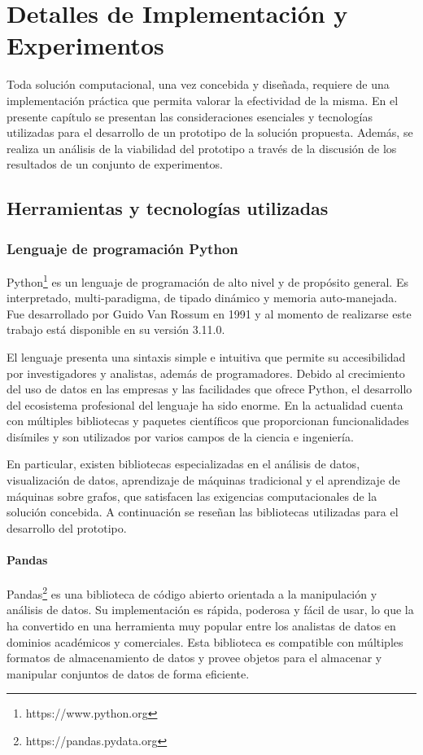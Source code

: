 \chapter{Detalles de Implementación y Experimentos}\label{chapter:implementation}

Toda soluci\'on computacional, una vez concebida y dise\~nada, requiere
de una implementaci\'on pr\'actica que permita valorar la efectividad de la misma.
En el presente cap\'itulo se presentan las consideraciones esenciales y tecnolog\'ias utilizadas
para el desarrollo de un prototipo de la soluci\'on propuesta. Adem\'as, se
realiza un an\'alisis de la viabilidad del prototipo a trav\'es de la discusi\'on de los resultados
de un conjunto de experimentos.
\section{Herramientas y tecnolog\'ias utilizadas}\label{section:tools}



\subsection{Lenguaje de programaci\'on Python}

Python\footnote[1]{https://www.python.org} es un lenguaje de programaci\'on de alto nivel y de prop\'osito
general. Es interpretado, multi-paradigma, de tipado din\'amico y memoria
auto-manejada. Fue desarrollado por Guido Van Rossum en 1991 y al momento
de realizarse este trabajo est\'a disponible en su versi\'on 3.11.0.

El lenguaje presenta una sintaxis simple e intuitiva que permite su
accesibilidad por investigadores y analistas, adem\'as de programadores.
Debido al crecimiento del uso de datos en las empresas
y las facilidades que ofrece Python, el desarrollo del ecosistema profesional
del lenguaje ha sido enorme. En la actualidad cuenta con m\'ultiples bibliotecas y
paquetes cient\'ificos que proporcionan
funcionalidades dis\'imiles y son utilizados por varios campos
de la ciencia e ingenier\'ia.

En particular, existen bibliotecas especializadas en el an\'alisis de
datos, visualizaci\'on de datos, aprendizaje
de m\'aquinas tradicional y el aprendizaje de m\'aquinas sobre grafos, que
satisfacen las exigencias computacionales de la soluci\'on concebida.
A continuaci\'on se rese\~nan las bibliotecas utilizadas para
el desarrollo del prototipo.


\subsubsection{Pandas}
Pandas\footnote[2]{https://pandas.pydata.org} es una biblioteca de c\'odigo abierto orientada
a la manipulaci\'on y an\'alisis de datos. Su implementaci\'on es
r\'apida, poderosa y f\'acil de usar, lo que la ha convertido en
una herramienta muy popular entre los analistas de datos en dominios
acad\'emicos y comerciales.
Esta biblioteca es compatible con m\'ultiples formatos
de almacenamiento de datos y provee objetos para el almacenar y manipular conjuntos de datos de forma eficiente.


